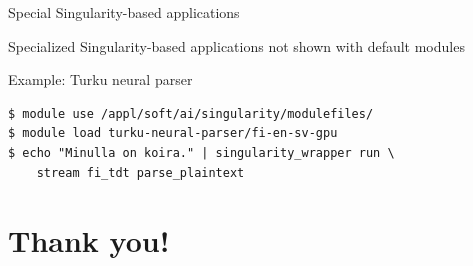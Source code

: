 \documentclass[aspectratio=1610,14pt]{beamer}
\begin{document}
\begin{frame}[fragile]{Special Singularity-based applications}

  Specialized Singularity-based applications not shown with default modules

  \vspace{1em}

  \alert{Example:} Turku neural parser

\begin{verbatim}
$ module use /appl/soft/ai/singularity/modulefiles/
$ module load turku-neural-parser/fi-en-sv-gpu
$ echo "Minulla on koira." | singularity_wrapper run \
    stream fi_tdt parse_plaintext
\end{verbatim}
  
\end{frame}

\section*{Thank you!}
\end{document}
